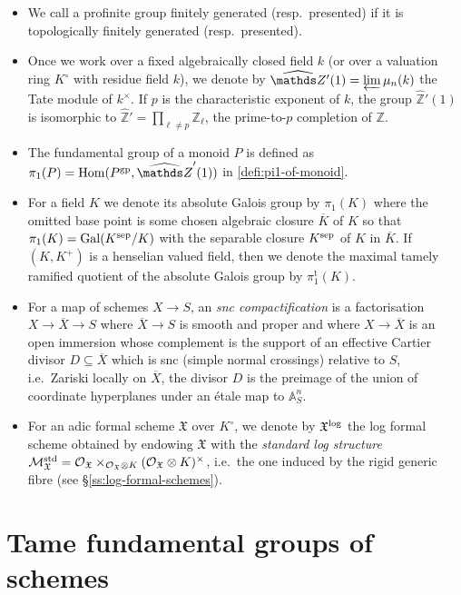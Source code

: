 \documentclass[a4paper,twoside,11pt,reqno]{amsart}
\renewcommand{\mathbb}{\mathds}
\newcommand{\bA}{{\mathbb A}}
\newcommand{\bZ}{{\mathbb Z}}
\newcommand{\cM}{{\mathcal M}}
\newcommand{\cO}{{\mathcal O}}
\newcommand{\fX}{{\mathfrak{X}}}
\DeclareMathOperator{\Hom}{Hom}
\DeclareMathOperator{\Gal}{Gal}
\newcommand{\sep}{{\rm sep}} %
\newcommand{\hZ}{{\widehat{\bZ}}}
\newcommand{\ov}[1]{\overline{#1}}
\newcommand{\pitame}{\pi_1^{\mathrm{t}}}
\theoremstyle{definition}
\numberwithin{equation}{subsection}
\begin{document}
\begin{itemize}[leftmargin=*]
    \item We call a profinite group finitely generated (resp.~presented) if it is topologically finitely generated (resp.~presented).
    
    \item 
    Once we work over a fixed algebraically closed field $k$ (or over a valuation ring $K^\circ$ with residue field $k$), we denote by $\hZ{}'(1) = \varprojlim \mu_n(k)$ the Tate module of $k^\times$. If $p$ is the characteristic exponent of $k$, the group $\hZ{}'(1)$ is isomorphic to $\hZ' = \prod_{\ell\neq p}\bZ_\ell$, the prime-to-$p$ completion of $\bZ$.

    \item 
    The fundamental group of a monoid $P$ is defined  as $\pi_1(P) = \Hom(P^{\rm gp}, \widehat{\bZ}'(1))$ in \cref{defi:pi1-of-monoid}.
    \item 
    For a field $K$ we denote its absolute Galois group by $\pi_1(K)$ where the omitted base point is some chosen algebraic closure $\ov{K}$ of $K$ so that $\pi_1(K) = \Gal(K^\sep/K)$ with the separable closure $K^\sep$ of $K$ in $\ov{K}$. If $(K,K^+)$ is a henselian valued field, then we denote the maximal tamely ramified quotient of the absolute Galois group by $\pitame(K)$.

    \item For a map of schemes $X\to S$, an \emph{snc compactification} is a factorisation $X\to \overline{X}\to S$ where $\overline{X}\to S$ is smooth and proper and where $X\to \overline{X}$ is an open immersion whose complement is the support of an effective Cartier divisor $D\subseteq \ov{X}$ which is snc (simple normal crossings) relative to $S$, i.e.\ Zariski locally on $\overline{X}$, the divisor $D$ is the preimage of the union of coordinate hyperplanes under an \'etale map to $\bA^n_S$.

    \item For an adic formal scheme $\fX$ over $K^\circ$, we denote by $\fX^{\rm log}$ the log formal scheme obtained by endowing $\fX$ with the \emph{standard log structure} $\cM_\fX^{\rm std}=\cO_\fX\times_{\cO_\fX\otimes K} (\cO_\fX\otimes K)^\times$, i.e.\ the one induced by the rigid generic fibre (see \S\ref{ss:log-formal-schemes}). 

\end{itemize}



\section{Tame fundamental groups of schemes}
\label{sec:pit schemes}
\end{document}

